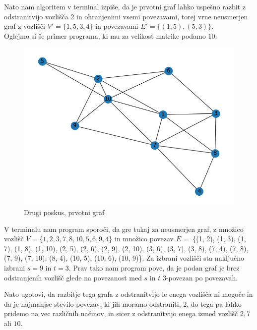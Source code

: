 \documentclass[a4paper,12pt]{article}
\theoremstyle{definition}
\begin{document}
Nato nam algoritem v terminal izpiše, da je prvotni graf lahko uspešno razbit z 
odstranitvijo vozlišča 2 in ohranjenimi vsemi povezavami,
torej vrne neusmerjen graf z vozlišči $V' = \{1, 5, 3, 4\}$ in povezavami $E' = \{(1, 5), (5, 3)\}$.\\

Oglejmo si še primer programa, ki mu za velikost matrike podamo $10$:

\begin{figure}[H]
	\caption{Drugi poskus, prvotni graf}
	\centering
	\includegraphics[scale=0.4]{slikovni_prikaz/Figure_2_0}
\end{figure}

V terminalu nam program sporoči, da gre tukaj za neusmerjen graf, 
z množico vozlišč $V = \{1, 2, 3, 7, 8, 10, 5, 6, 9, 4\}$ in množico povezav 
$E =$ \{(1, 2), (1, 3), (1, 7), (1, 8), (1, 10), (2, 5), (2, 6), (2, 9), (2, 10), (3, 6), (3, 7), (3, 8), (7, 4), (7, 8), (7, 9), (7, 10), (8, 4), (10, 5), (10, 6), (10, 9)\}.
Za izbrani vozlišči sta naključno izbrani $s = 9$ in $t = 3$. 
Prav tako nam program pove, da je podan graf je brez odstranjenih vozlišč
glede na povezanost med $s$ in $t$ 3-povezan po povezavah.

Nato ugotovi, da razbitje tega grafa z odstranitvijo le enega vozlišča
ni mogoče in da je najmanjse stevilo povezav, ki jih moramo odstraniti, 2, 
do tega pa lahko pridemo na vec različnih načinov, in sicer z odstranitvijo enega
izmed vozlišč $2, 7$ ali $10$.
\end{document}
